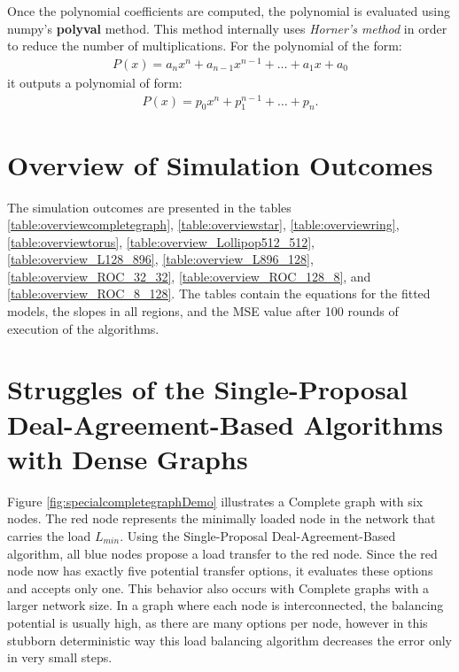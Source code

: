 Once the polynomial coefficients are computed, the polynomial is evaluated using numpy's \textbf{polyval} method. This method internally uses \textit{Horner's method} in order to reduce the number of multiplications. For the polynomial of the form:
\begin{align}
    P(x) = a_{n}x^{n}+a_{n-1}x^{n-1}+ \dots + a_{1}x+a_{0}
\end{align}
it outputs a polynomial of form:
\begin{align}
    P(x)=p_{0}x^{n}+p_{1}^{n-1}+\dots + p_{n}.
\end{align}
\cite{wolfram_horner}

\section{Overview of Simulation Outcomes}\label{sec:overviewSimOutcomes}
The simulation outcomes are presented in the tables \ref{table:overviewcompletegraph}, \ref{table:overviewstar}, \ref{table:overviewring}, \ref{table:overviewtorus}, \ref{table:overview_Lollipop512_512}, \ref{table:overview_L128_896}, \ref{table:overview_L896_128}, \ref{table:overview_ROC_32_32}, \ref{table:overview_ROC_128_8}, and \ref{table:overview_ROC_8_128}. The tables contain the equations for the fitted models, the slopes in all regions, and the MSE value after 100 rounds of execution of the algorithms.













\section{Struggles of the Single-Proposal Deal-Agreement-Based Algorithms with Dense Graphs}\label{sec:struggleDAB}
Figure \ref{fig:specialcompletegraphDemo} illustrates a Complete graph with six nodes. The red node represents the minimally loaded node in the network that carries the load $L_{min}$. Using the Single-Proposal Deal-Agreement-Based algorithm, all blue nodes propose a load transfer to the red node. Since the red node now has exactly five potential transfer options, it evaluates these options and accepts only one. This behavior also occurs with Complete graphs with a larger network size. In a graph where each node is interconnected, the balancing potential is usually high, as there are many options per node, however in this stubborn deterministic way this load balancing algorithm decreases the error only in very small steps.

